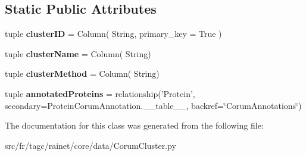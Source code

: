\subsection*{Static Public Attributes}
\begin{DoxyCompactItemize}
\item 
\hypertarget{classsrc_1_1fr_1_1tagc_1_1rainet_1_1core_1_1data_1_1CorumCluster_1_1CorumCluster_a9d78430da10cb503f5f89091222c6059}{tuple {\bfseries cluster\-I\-D} = Column( String, primary\-\_\-key = True )}\label{classsrc_1_1fr_1_1tagc_1_1rainet_1_1core_1_1data_1_1CorumCluster_1_1CorumCluster_a9d78430da10cb503f5f89091222c6059}

\item 
\hypertarget{classsrc_1_1fr_1_1tagc_1_1rainet_1_1core_1_1data_1_1CorumCluster_1_1CorumCluster_aaed5930ff71b9f3c9ccd19d0397d07b4}{tuple {\bfseries cluster\-Name} = Column( String)}\label{classsrc_1_1fr_1_1tagc_1_1rainet_1_1core_1_1data_1_1CorumCluster_1_1CorumCluster_aaed5930ff71b9f3c9ccd19d0397d07b4}

\item 
\hypertarget{classsrc_1_1fr_1_1tagc_1_1rainet_1_1core_1_1data_1_1CorumCluster_1_1CorumCluster_ae60fe6261540bfbf0b84c6d26db3510e}{tuple {\bfseries cluster\-Method} = Column( String)}\label{classsrc_1_1fr_1_1tagc_1_1rainet_1_1core_1_1data_1_1CorumCluster_1_1CorumCluster_ae60fe6261540bfbf0b84c6d26db3510e}

\item 
\hypertarget{classsrc_1_1fr_1_1tagc_1_1rainet_1_1core_1_1data_1_1CorumCluster_1_1CorumCluster_add238654f24b6cdcd703f1f391fcf544}{tuple {\bfseries annotated\-Proteins} = relationship('Protein', secondary=Protein\-Corum\-Annotation.\-\_\-\-\_\-table\-\_\-\-\_\-, backref=\char`\"{}Corum\-Annotations\char`\"{})}\label{classsrc_1_1fr_1_1tagc_1_1rainet_1_1core_1_1data_1_1CorumCluster_1_1CorumCluster_add238654f24b6cdcd703f1f391fcf544}

\end{DoxyCompactItemize}


The documentation for this class was generated from the following file\-:\begin{DoxyCompactItemize}
\item 
src/fr/tagc/rainet/core/data/Corum\-Cluster.\-py\end{DoxyCompactItemize}
